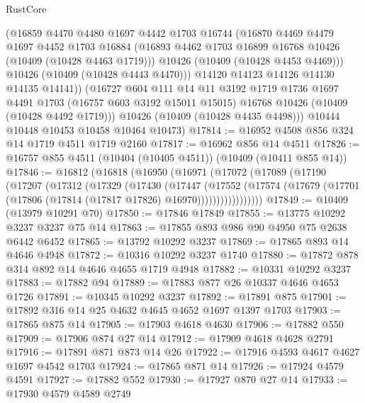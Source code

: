 \begin{lexlean}{RustCore}
\begin{coremodule}
            (@16859
              @4470
              @4480
              @1697
              @4442
              @1703
              @16744
              (@16870
                @4469
                @4479
                @1697
                @4452
                @1703
                @16884
                (@16893 @4462 @1703 @16899 @16768 @10426 (@10409 (@10428 @4463 @1719)))
                @10426
                (@10409 (@10428 @4453 @4469)))
              @10426
              (@10409 (@10428 @4443 @4470)))
            @14120
            @14123
            @14126
            @14130
            @14135
            @14141))
        (@16727
          @604
          @111
          @14
          @11
          @3192
          @1719
          @1736
          @1697
          @4491
          @1703
          (@16757 @603 @3192 @15011 @15015)
          @16768
          @10426
          (@10409 (@10428 @4492 @1719)))
        @10426
        (@10409 (@10428 @4435 @4498)))
      @10444
      @10448
      @10453
      @10458
      @10464
      @10473)
@17814 := @16952 @4508 @856 @324 @14 @1719 @4511 @1719 @2160
@17817 := @16962 @856 @14 @4511
@17826 := @16757 @855 @4511 (@10404 (@10405 @4511)) (@10409 (@10411 @855 @14))
@17846 := @16812
    (@16818
      (@16950
        (@16971
          (@17072
            (@17089
              (@17190
                (@17207
                  (@17312
                    (@17329
                      (@17430
                        (@17447
                          (@17552
                            (@17574
                              (@17679
                                (@17701 (@17806 (@17814 (@17817 @17826) @16970)))))))))))))))))
@17849 := @10409 (@13979 @10291 @70)
@17850 := @17846 @17849
@17855 := @13775 @10292 @3237 @3237 @75 @14
@17863 := @17855 @893 @986 @90 @4950 @75 @2638 @6442 @6452
@17865 := @13792 @10292 @3237
@17869 := @17865 @893 @14 @4646 @4948
@17872 := @10316 @10292 @3237 @1740
@17880 := @17872 @878 @314 @892 @14 @4646 @4655 @1719 @4948
@17882 := @10331 @10292 @3237
@17883 := @17882 @94
@17889 := @17883 @877 @26 @10337 @4646 @4653 @1726
@17891 := @10345 @10292 @3237
@17892 := @17891 @875
@17901 := @17892 @316 @14 @25 @4632 @4645 @4652 @1697 @1397 @1703
@17903 := @17865 @875 @14
@17905 := @17903 @4618 @4630
@17906 := @17882 @550
@17909 := @17906 @874 @27 @14
@17912 := @17909 @4618 @4628 @2791
@17916 := @17891 @871 @873 @14 @26
@17922 := @17916 @4593 @4617 @4627 @1697 @4542 @1703
@17924 := @17865 @871 @14
@17926 := @17924 @4579 @4591
@17927 := @17882 @552
@17930 := @17927 @870 @27 @14
@17933 := @17930 @4579 @4589 @2749

\end{coremodule}
\end{lexlean}
